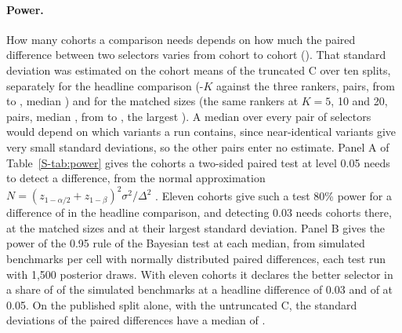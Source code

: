 \paragraph{Power.} How many cohorts a comparison needs depends on how much the paired
difference between two selectors varies from cohort to cohort ().
That standard deviation was estimated on the cohort means of the truncated C over ten
splits, separately for the headline comparison (-$K$ against the three rankers,
\SuppPairsHead{} pairs, from \SuppSigmaHeadMin{} to \SuppSigmaHeadMax, median
\SuppSigmaHead) and for the matched sizes (the same rankers at $K = 5$, 10 and 20,
\SuppPairsMatched{} pairs, median \SuppSigmaMatched, from \SuppSigmaMatchedMin{} to
\SuppSigmaMatchedMax, the largest \SuppSigmaMatchedMaxWhat). A median over every pair of
selectors would depend on which variants a run contains, since near-identical variants
give very small standard deviations, so the other pairs enter no estimate. Panel A of
Table~\ref{S-tab:power} gives the cohorts a two-sided paired test at level 0.05 needs to
detect a difference, from the normal approximation
$N = (z_{1-\alpha/2} + z_{1-\beta})^2 \sigma^2 / \Delta^2$
\citep{boulesteix2017}. Eleven cohorts give such a test 80\% power for a difference of
\SuppDeltaHead{} in the headline comparison, and detecting 0.03 needs
\SuppNeedThreeHead{} cohorts there, \SuppNeedThreeMatched{} at the matched sizes and
\SuppNeedThreeMatchedMax{} at their largest standard deviation. Panel B gives the power of
the 0.95 rule of the Bayesian test at each median, from \SuppPowerReps{} simulated
benchmarks per cell with normally distributed paired differences, each test run with
1{,}500 posterior draws. With eleven cohorts it declares the better selector in a share of
\SuppPowerHeadThree{} of the simulated benchmarks at a headline difference of 0.03 and of
\SuppPowerHeadFive{} at 0.05. On the published split alone, with the untruncated C, the
standard deviations of the paired differences have a median of \SuppSdLegacy.

\begin{table}[htbp]
\centering\footnotesize
\caption{Number of cohorts needed to resolve a difference in truncated Uno's C, for the
headline comparison and for the matched sizes. Panel A: cohorts a paired test needs at
80\% and 90\% power at the median standard deviation of paired differences, and at 80\%
power at the largest one. Panel B: share of simulated benchmarks in which the Bayesian
signed-rank test declares the better selector, with its Monte Carlo standard error in
brackets.}
\label{S-tab:power}

\end{table}

